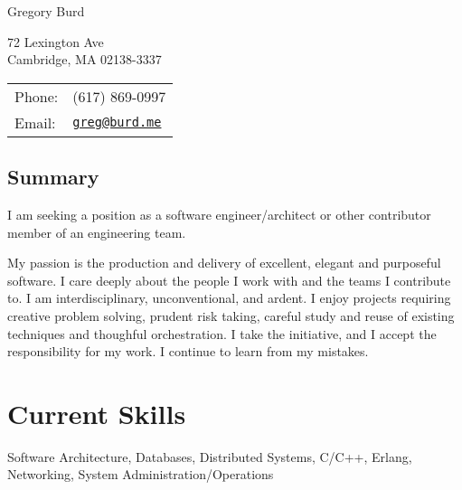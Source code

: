 \documentclass[letterpaper]{article}
\def\name{Gregory Burd}
\renewenvironment{itemize}{
  \begin{list}{}{
    \setlength{\leftmargin}{1.5em}
  }
}{
  \end{list}
}
\begin{document}
{\huge \name}


\vspace{0.25in}

\begin{minipage}{0.45\linewidth}
  72 Lexington Ave \\
  Cambridge, MA 02138-3337
\end{minipage}
\begin{minipage}{0.45\linewidth}
  \begin{tabular}{ll}
    Phone: & (617) 869-0997 \\
    Email: & \href{mailto:greg@burd.me}{\tt greg@burd.me} \\
  \end{tabular}
\end{minipage}

\vspace{0.25in}

\subsection*{Summary}

\begin{itemize}

\item I am seeking a position as a software engineer/architect or other
  contributor member of an engineering team.

\item My passion is the production and delivery of excellent, elegant and
  purposeful software. I care deeply about the people I work with and the teams
  I contribute to. I am interdisciplinary, unconventional, and ardent. I enjoy
  projects requiring creative problem solving, prudent risk taking, careful
  study and reuse of existing techniques and thoughful orchestration. I take
  the initiative, and I accept the responsibility for my work. I continue to
  learn from my mistakes.

\end{itemize}


\section*{Current Skills}

\begin{itemize}
\item Software Architecture, Databases, Distributed Systems, C/C++, Erlang,
  Networking, System Administration/Operations
\end{itemize}
\end{document}
